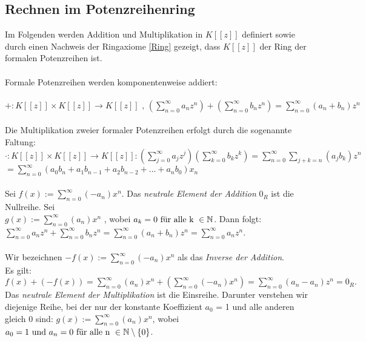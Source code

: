 \subsection{Rechnen im Potenzreihenring} \label{Rechnen}
Im Folgenden werden Addition und Multiplikation in $K[[z]]$ definiert sowie durch einen Nachweis der Ringaxiome \ref{Ring}  gezeigt, dass $K[[z]]$ der Ring der formalen Potenzreihen ist. \\ \\
Formale Potenzreihen werden komponentenweise addiert: \\ \\
%
$+: K [[z]] \times K [[z]] \to K[[z]] \text{ , } \left( \sum_{n=0}^\infty a_n z^n \right) + \left( \sum_{n=0}^\infty b_n z^n \right) = \sum_{n=0}^{\infty} (a_n + b_n) z^n $ \\ \\
%
Die Multiplikation zweier formaler Potenzreihen erfolgt durch die sogenannte Faltung:
$\cdot:  K [[z]] \times K [[z]] \to K[[z]]: \left( \sum_{j=0}^\infty a_j z^j \right) \left( \sum_{k=0}^\infty b_k z^k \right)  
= \sum_{n=0}^\infty\sum_{j+k=n} (a_j b_k) z^n $
\vspace{8pt}
\\$= \sum_{n= 0}^\infty \left(a_0b_n + a_1b_{n-1} + a_2b_{n-2} + ... + a_nb_0 \right)x_n$
%
\\ \\ Sei $ f(x) := \sum_{n=0}^\infty  (-a_n)x^n$. Das \textit{neutrale Element der Addition} $0_R$ ist die Nullreihe. Sei   \\
$ g(x) := \sum_{n=0}^\infty  (a_n)x^n$ , wobei $a_k= 0 \text{ für alle k } \in \mathbb{N} $. Dann folgt: \\ $ \sum_{n=0}^\infty a_nz^n + \sum_{n=0}^\infty b_nz^n = \sum_{n=0}^\infty \left(a_n+b_n\right)z^n = \sum_{n=0}^\infty a_nz^n $.
\\ \\
Wir bezeichnen $ -f(x) := \sum_{n=0}^\infty  (-a_n)x^n$ als das \textit{Inverse der Addition}.\\ Es gilt: $ f(x) + (-f(x)) = \sum_{n=0}^\infty  (a_n)x^n + (\sum_{n=0}^\infty  (-a_n)x^n) = \sum_{n=0}^{\infty}(a_n-a_n)z^n = 0_R. $ Das \textit{neutrale Element der Multiplikation} ist die Einsreihe.  Darunter verstehen wir diejenige Reihe, bei der nur der konstante Koeffizient $a_0$ = 1 und alle anderen gleich 0 sind:  $ g(x) := \sum_{n=0}^\infty  (a_n)x^n$, wobei $a_0 = 1 \text{ und } a_n = 0 \text{ für alle n } \in \mathbb{N}\setminus\lbrace 0\rbrace $. \\ 
